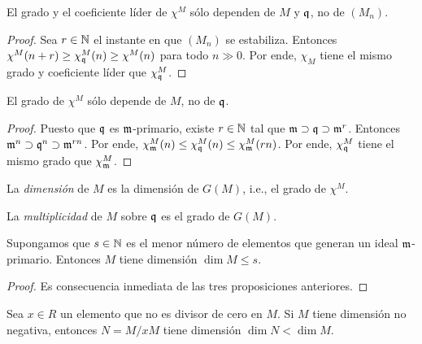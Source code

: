 \begin{proposition}
El grado y el coeficiente líder de $\chi^M$ sólo dependen de $M$ y $\mathfrak q$, no de $(M_n)$.
\end{proposition}

\begin{proof}
Sea $r \in \mathbb N$ el instante en que $(M_n)$ se estabiliza. Entonces $\chi^M(n+r) \ge \chi_\mathfrak q^M(n) \ge \chi^M(n)$ para todo $n \gg 0$. Por ende, $\chi_M$ tiene el mismo grado y coeficiente líder que $\chi_\mathfrak q^M$.
\end{proof}

\begin{proposition}
El grado de $\chi^M$ sólo depende de $M$, no de $\mathfrak q$.
\end{proposition}

\begin{proof}
Puesto que $\mathfrak q$ es $\mathfrak m$-primario, existe $r \in \mathbb N$ tal que $\mathfrak m \supset \mathfrak q \supset \mathfrak m^r$. Entonces $\mathfrak m^n \supset \mathfrak q^n \supset \mathfrak m^{rn}$. Por ende, $\chi_\mathfrak m^M(n) \le \chi_\mathfrak q^M(n) \le \chi_\mathfrak m^M(rn)$. Por ende, $\chi_\mathfrak q^M$ tiene el mismo grado que $\chi_\mathfrak m^M$.
\end{proof}

\begin{definition}
La \textit{dimensión} de $M$ es la dimensión de $G(M)$, i.e., el grado de $\chi^M$.
\end{definition}

\begin{definition}
La \textit{multiplicidad} de $M$ sobre $\mathfrak q$ es el grado de $G(M)$.
\end{definition}

\begin{corollary}
Supongamos que $s \in \mathbb N$ es el menor número de elementos que generan un ideal $\mathfrak m$-primario. Entonces $M$ tiene dimensión $\dim M \le s$.
\end{corollary}

\begin{proof}
Es consecuencia inmediata de las tres proposiciones anteriores.
\end{proof}

\begin{proposition}
Sea $x \in R$ un elemento que no es divisor de cero en $M$. Si $M$ tiene dimensión no negativa, entonces $N = M/xM$ tiene dimensión $\dim N < \dim M$.
\end{proposition}

